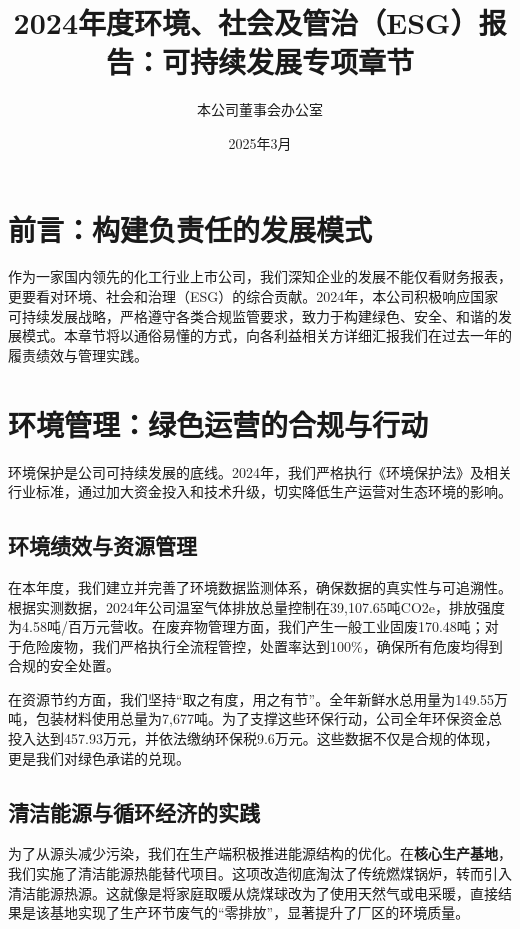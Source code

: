 \documentclass[a4paper,12pt]{article}
\title{\textbf{2024年度环境、社会及管治（ESG）报告：可持续发展专项章节}}
\author{本公司董事会办公室}
\date{2025年3月}
\begin{document}
\maketitle

\section*{前言：构建负责任的发展模式}

作为一家国内领先的化工行业上市公司，我们深知企业的发展不能仅看财务报表，更要看对环境、社会和治理（ESG）的综合贡献。2024年，本公司积极响应国家可持续发展战略，严格遵守各类合规监管要求，致力于构建绿色、安全、和谐的发展模式。本章节将以通俗易懂的方式，向各利益相关方详细汇报我们在过去一年的履责绩效与管理实践。

\section{环境管理：绿色运营的合规与行动}

环境保护是公司可持续发展的底线。2024年，我们严格执行《环境保护法》及相关行业标准，通过加大资金投入和技术升级，切实降低生产运营对生态环境的影响。

\subsection{环境绩效与资源管理}

在本年度，我们建立并完善了环境数据监测体系，确保数据的真实性与可追溯性。根据实测数据，2024年公司温室气体排放总量控制在39,107.65吨CO2e，排放强度为4.58吨/百万元营收。在废弃物管理方面，我们产生一般工业固废170.48吨；对于危险废物，我们严格执行全流程管控，处置率达到100\%，确保所有危废均得到合规的安全处置。

在资源节约方面，我们坚持“取之有度，用之有节”。全年新鲜水总用量为149.55万吨，包装材料使用总量为7,677吨。为了支撑这些环保行动，公司全年环保资金总投入达到457.93万元，并依法缴纳环保税9.6万元。这些数据不仅是合规的体现，更是我们对绿色承诺的兑现。

\subsection{清洁能源与循环经济的实践}

为了从源头减少污染，我们在生产端积极推进能源结构的优化。在\textbf{核心生产基地}，我们实施了清洁能源热能替代项目。这项改造彻底淘汰了传统燃煤锅炉，转而引入清洁能源热源。这就像是将家庭取暖从烧煤球改为了使用天然气或电采暖，直接结果是该基地实现了生产环节废气的“零排放”，显著提升了厂区的环境质量。
\end{document}

